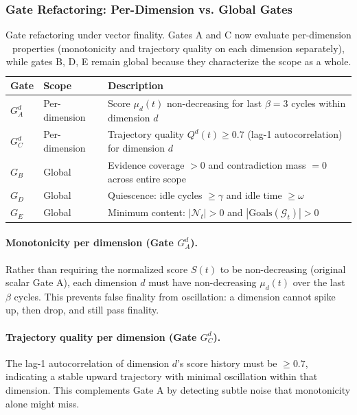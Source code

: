 \documentclass[11pt]{article}
\begin{document}
\subsubsection{Gate Refactoring: Per-Dimension vs. Global Gates}

\begin{table}[H]
\centering
\small
\begin{tabular}{llp{6cm}}
\toprule
\textbf{Gate} & \textbf{Scope} & \textbf{Description} \\
\midrule
$G_A^d$ & Per-dimension & Score $\mu_d(t)$ non-decreasing for last $\beta = 3$ cycles within dimension $d$ \\
$G_C^d$ & Per-dimension & Trajectory quality $Q^d(t) \geq 0.7$ (lag-1 autocorrelation) for dimension $d$ \\
$G_B$ & Global & Evidence coverage $> 0$ and contradiction mass $= 0$ across entire scope \\
$G_D$ & Global & Quiescence: idle cycles $\geq \gamma$ and idle time $\geq \omega$ \\
$G_E$ & Global & Minimum content: $|\mathcal{N}_t| > 0$ and $|\text{Goals}(\mathcal{G}_t)| > 0$ \\
\bottomrule
\end{tabular}
\caption{Gate refactoring under vector finality. Gates A and C now evaluate per-dimension
properties (monotonicity and trajectory quality on each dimension separately), while gates B, D, E
remain global because they characterize the scope as a whole.}
\label{tab:gate-refactoring}
\end{table}

\paragraph{Monotonicity per dimension (Gate $G_A^d$).}
Rather than requiring the normalized score $S(t)$ to be non-decreasing (original scalar Gate A),
each dimension $d$ must have non-decreasing $\mu_d(t)$ over the last $\beta$ cycles. This prevents
false finality from oscillation: a dimension cannot spike up, then drop, and still pass finality.

\paragraph{Trajectory quality per dimension (Gate $G_C^d$).}
The lag-1 autocorrelation of dimension $d$'s score history must be $\geq 0.7$, indicating a stable
upward trajectory with minimal oscillation within that dimension. This complements Gate A by detecting
subtle noise that monotonicity alone might miss.
\end{document}
